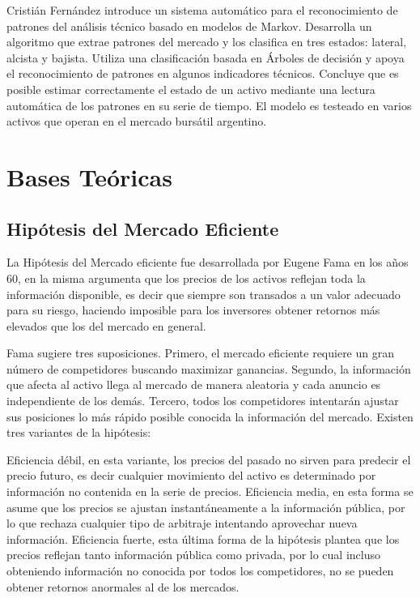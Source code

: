 \documentclass[a4paper,12pt]{Latex/Classes/PhDthesisPSnPDF}
\begin{document}
Cristián Fernández introduce un sistema automático para el reconocimiento de patrones del análisis técnico basado en modelos de Markov. Desarrolla un algoritmo que extrae patrones del mercado y los clasifica en tres estados: lateral, alcista y bajista. Utiliza una clasificación basada en Árboles de decisión y apoya el reconocimiento de patrones en algunos indicadores técnicos. Concluye que es posible estimar correctamente el estado de un activo mediante una lectura automática de los patrones en su serie de tiempo. El modelo es testeado en varios activos que operan en el mercado bursátil argentino.


\section{Bases Teóricas}


\subsection{Hipótesis del Mercado Eficiente}

La Hipótesis del Mercado eficiente fue desarrollada por Eugene Fama en los años 60, en la misma argumenta que los precios de los activos reflejan toda la información disponible, es decir que siempre son transados a un valor adecuado para su riesgo, haciendo imposible para los inversores obtener retornos más elevados que los del mercado en general. 

Fama sugiere tres suposiciones. Primero, el mercado eficiente requiere un gran número de competidores buscando maximizar ganancias. Segundo, la información que afecta al activo llega al mercado de manera aleatoria y cada anuncio es independiente de los demás. Tercero, todos los competidores intentarán ajustar sus posiciones lo más rápido posible conocida la información del mercado. Existen tres variantes de la hipótesis:

Eficiencia débil, en esta variante, los precios del pasado no sirven para predecir el precio futuro, es decir cualquier movimiento del activo es determinado por información no contenida en la serie de precios. Eficiencia media, en esta forma se asume que los precios se ajustan instantáneamente a la información pública, por lo que rechaza cualquier tipo de arbitraje intentando aprovechar nueva información. Eficiencia fuerte, esta última forma de la hipótesis plantea que los precios reflejan tanto información pública como privada, por lo cual incluso obteniendo información no conocida por todos los competidores, no se pueden obtener retornos anormales al de los mercados.
\end{document}
